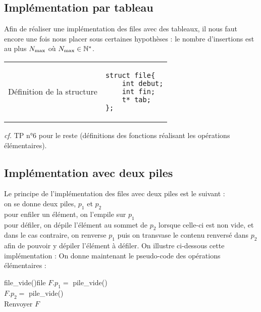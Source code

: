 	\subsection{Implémentation par tableau}
	
		Afin de réaliser une implémentation des files avec des tableaux, il nous faut encore une fois nous placer sous certaines hypothèses : le nombre d'insertions est au plus \(N_\rm{max}\) où \(N_\rm{max} \in \bb{N}^*\).
		
		\begin{center}
			\begin{tabular}[h]{r|p{}}
				Définition de la structure &
				\begin{minipage}[t]{0.5\textwidth}
					\begin{verbatim}
struct file{
	int debut;
	int fin;
	t* tab;
};
					\end{verbatim}
				\end{minipage}
				\end{tabular}
			\end{center}
		
		\emph{cf.} TP n°6 pour le reste (définitions des fonctions réalisant les opérations élémentaires).
		
	\subsection{Implémentation avec deux piles}
		
		Le principe de l'implémentation des files avec deux piles est le suivant : \\
			 \bdot on se donne deux piles, \(p_1\) et \(p_2\) \\
			 \bdot pour enfiler un élément, on l'empile sur \(p_1\) \\
			 \bdot pour défiler, on dépile l'élément au sommet de \(p_2\) lorsque celle-ci est non vide, et dans le cas contraire, on renverse \(p_1\) puis on transvase le contenu renversé dans \(p_2\) afin de pouvoir y dépiler l'élément à défiler. \nt
		On illustre ci-dessous cette implémentation : \nll
		On donne maintenant le pseudo-code des opérations élémentaires :
		
		\begin{pscode}{file\_vide}{()}{file}{}
			\(F.p_1 = \) \textsf{pile\_vide}() \\
			\(F.p_2 = \) \textsf{pile\_vide}() \\
			Renvoyer \(F\)
		\end{pscode}
		
